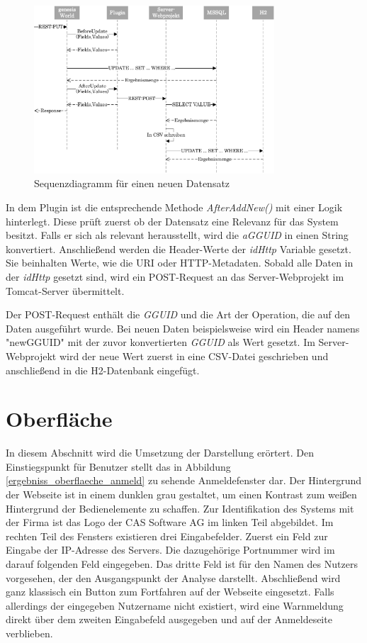 \begin{figure}[htbp]
\centering
  \includegraphics[width=0.8\textwidth]{pics/sequenzdiagramm.pdf}
\caption{Sequenzdiagramm für einen neuen Datensatz}
\label{umsetzung_sequenz}
\end{figure}

In dem Plugin ist die entsprechende Methode \textit{AfterAddNew()} mit einer Logik hinterlegt. Diese prüft zuerst ob der Datensatz eine Relevanz für das System besitzt. Falls er sich als relevant herausstellt, wird die \textit{aGGUID} in einen String konvertiert. Anschließend werden die Header-Werte der \textit{idHttp} Variable gesetzt. Sie beinhalten Werte, wie die URI oder HTTP-Metadaten. Sobald alle Daten in der \textit{idHttp} gesetzt sind, wird ein POST-Request an das Server-Webprojekt im Tomcat-Server übermittelt. 

Der POST-Request enthält die \textit{GGUID} und die Art der Operation, die auf den Daten ausgeführt wurde. Bei neuen Daten beispielsweise wird ein Header namens "newGGUID" mit der zuvor konvertierten \textit{GGUID} als Wert gesetzt. Im Server-Webprojekt wird der neue Wert zuerst in eine CSV-Datei geschrieben und anschließend in die H2-Datenbank eingefügt.


\section{Oberfläche}

In diesem Abschnitt wird die Umsetzung der Darstellung erörtert. Den Einstiegspunkt für Benutzer stellt das in Abbildung \ref{ergebniss_oberflaeche_anmeld} zu sehende Anmeldefenster dar. Der Hintergrund der Webseite ist in einem dunklen grau gestaltet, um einen Kontrast zum weißen Hintergrund der Bedienelemente zu schaffen. Zur Identifikation des Systems mit der Firma ist das Logo der CAS Software AG im linken Teil abgebildet. Im rechten Teil des Fensters existieren drei Eingabefelder. Zuerst ein Feld zur Eingabe der IP-Adresse des Servers. Die dazugehörige Portnummer wird im darauf folgenden Feld eingegeben. Das dritte Feld ist für den Namen des Nutzers vorgesehen, der den Ausgangspunkt der Analyse darstellt. Abschließend wird ganz klassisch ein Button zum Fortfahren auf der Webseite eingesetzt. Falls allerdings der eingegeben Nutzername nicht existiert, wird eine Warnmeldung direkt über dem zweiten Eingabefeld ausgegeben und auf der Anmeldeseite verblieben. 

